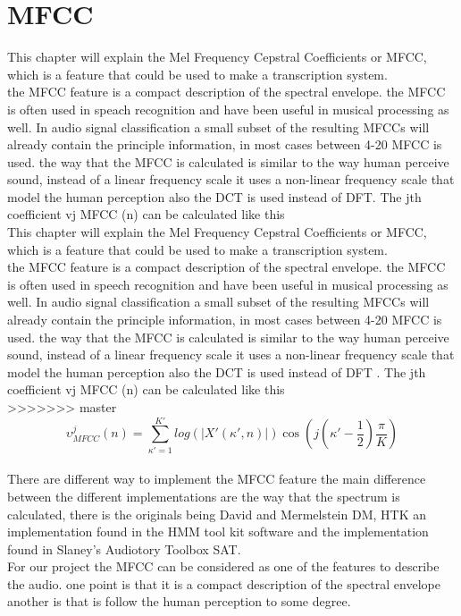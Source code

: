 \section{MFCC}

This chapter will explain the Mel Frequency Cepstral Coefficients or MFCC, which is a feature that could be used to make a transcription system. \\
the MFCC feature is a compact description of the spectral envelope. the MFCC is often used in speach recognition and have been useful in musical processing as well\citep{ACA}. In audio signal classification a small subset of the resulting MFCCs will already contain the principle information, in most cases between 4-20 MFCC is used. the way that the MFCC is calculated is  similar to the way human perceive sound, instead of a linear frequency scale it uses a non-linear frequency scale that model the human perception also the DCT is used instead of DFT\citep{ACA}. The jth coefficient 
vj MFCC (n) can be calculated like this\citep{ACA}\\
This chapter will explain the Mel Frequency Cepstral Coefficients or MFCC, which is a feature that could be used to make a transcription system. \\
the MFCC feature is a compact description of the spectral envelope. the MFCC is often used in speech recognition and have been useful in musical processing as well\citep{ACA}. In audio signal classification a small subset of the resulting MFCCs will already contain the principle information, in most cases between 4-20 MFCC is used. the way that the MFCC is calculated is  similar to the way human perceive sound, instead of a linear frequency scale it uses a non-linear frequency scale that model the human perception also the DCT is used instead of DFT \citep{ACA}. The jth coefficient 
vj  MFCC (n) can be calculated like this\citep{ACA}\\
>>>>>>> master
\begin{equation}\label{ eq:MFCC calculation}
	 \upsilon ^j  _{MFCC} (n) = \sum_{\kappa'=1}^{K'} log(\vert X' (\kappa',n) \vert)\cos(j(\kappa' - \frac{1}{2})\frac{\pi}{K})
\end{equation}
\\
There are different way to implement the MFCC feature the main difference between the different implementations are the way that the spectrum is calculated, there is the originals being David and Mermelstein DM, HTK an implementation found in the HMM tool kit software and the implementation found in Slaney's Audiotory Toolbox SAT\citep{Slaney}.
\\
For our project the MFCC can be considered as one of the features to describe the audio. one point is that it is a compact description of the spectral envelope another is that is follow the human perception to some degree.
